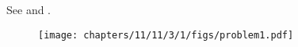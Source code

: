 See 
and 
.
\begin{figure}[H]
	\begin{center}
		\texttt{[image: chapters/11/11/3/1/figs/problem1.pdf]}
	\end{center}
\caption{}
\label{fig:chapters/11/11/3/1/Fig1}
\end{figure}
